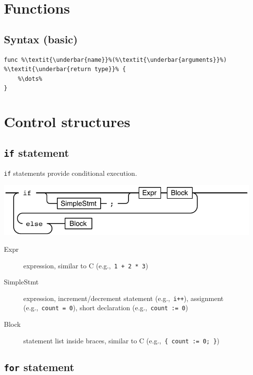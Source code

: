 \documentclass{article}
\begin{document}
\begin{multicols*}{3}
  \filbreak
  \section*{Functions}

  \subsection*{Syntax (basic)}

  \begin{lstlisting}[numbers=none,escapechar=\%]
func %\textit{\underbar{name}}%(%\textit{\underbar{arguments}}%) %\textit{\underbar{return type}}% {
    %\dots%
}
\end{lstlisting}

  \filbreak
  \section*{Control structures}

  \subsection*{\texttt{if} statement}

  \lstinline{if} statements provide conditional execution.

  \includegraphics[width=\linewidth]{if}

  \begin{description}
  \item[Expr] expression, similar to C (e.g.,~\lstinline{1 + 2 * 3})
  \item[SimpleStmt] expression, increment/decrement statement (e.g.,~\lstinline{i++}), assignment (e.g.,~\lstinline{count = 0}), short declaration (e.g.,~\lstinline{count := 0})
  \item[Block] statement list inside braces, similar to C (e.g.,~\lstinline!{ count := 0; }!)
  \end{description}

  \subsection*{\texttt{for} statement}


\end{multicols*}
\end{document}
